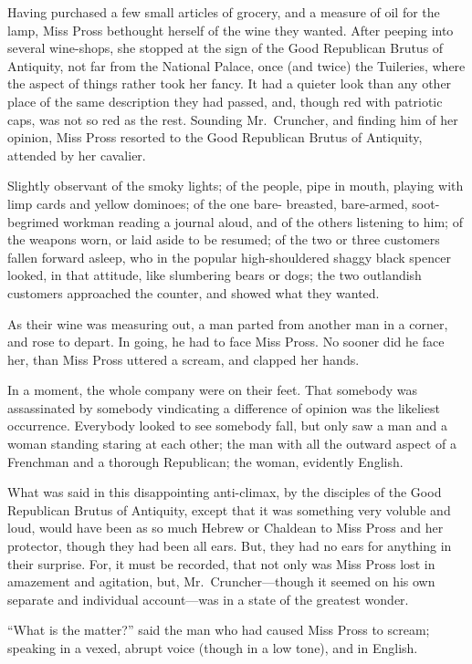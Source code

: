 Having purchased a few small articles of grocery, and a measure of
oil for the lamp, Miss Pross bethought herself of the wine they
wanted. After peeping into several wine-shops, she stopped at the
sign of the Good Republican Brutus of Antiquity, not far from the
National Palace, once (and twice) the Tuileries, where the aspect of
things rather took her fancy.  It had a quieter look than any other
place of the same description they had passed, and, though red with
patriotic caps, was not so red as the rest.  Sounding Mr.\ Cruncher,
and finding him of her opinion, Miss Pross resorted to the Good
Republican Brutus of Antiquity, attended by her cavalier.

Slightly observant of the smoky lights; of the people, pipe in mouth,
playing with limp cards and yellow dominoes; of the one bare-%
breasted, bare-armed, soot-begrimed workman reading a journal aloud,
and of the others listening to him; of the weapons worn, or laid
aside to be resumed; of the two or three customers fallen forward
asleep, who in the popular high-shouldered shaggy black spencer
looked, in that attitude, like slumbering bears or dogs; the two
outlandish customers approached the counter, and showed what they wanted.

As their wine was measuring out, a man parted from another man in a
corner, and rose to depart.  In going, he had to face Miss Pross.
No sooner did he face her, than Miss Pross uttered a scream, and
clapped her hands.

In a moment, the whole company were on their feet.  That somebody was
assassinated by somebody vindicating a difference of opinion was the
likeliest occurrence.  Everybody looked to see somebody fall, but
only saw a man and a woman standing staring at each other; the man
with all the outward aspect of a Frenchman and a thorough Republican;
the woman, evidently English.

What was said in this disappointing anti-climax, by the disciples of
the Good Republican Brutus of Antiquity, except that it was something
very voluble and loud, would have been as so much Hebrew or Chaldean
to Miss Pross and her protector, though they had been all ears.  But,
they had no ears for anything in their surprise.  For, it must be
recorded, that not only was Miss Pross lost in amazement and
agitation, but, Mr.\ Cruncher---though it seemed on his own separate
and individual account---was in a state of the greatest wonder.

``What is the matter?'' said the man who had caused Miss Pross to scream;
speaking in a vexed, abrupt voice (though in a low tone), and in
English.

